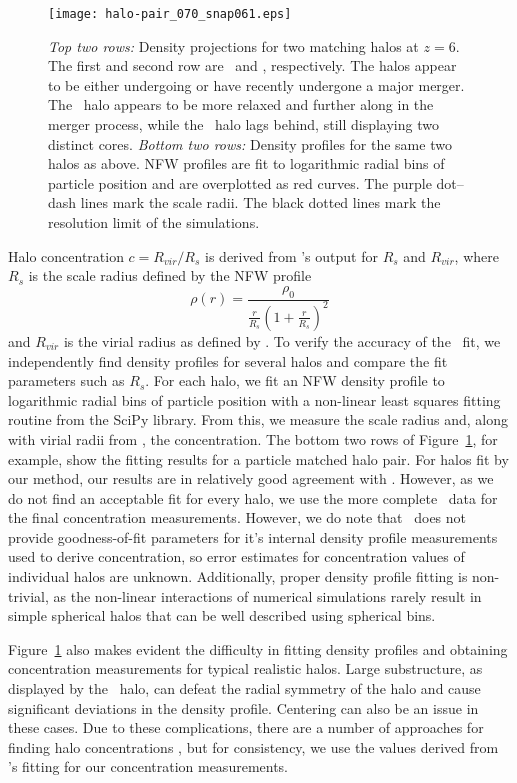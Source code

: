 \begin{figure}[t]
    \centering
    \texttt{[image: halo-pair\_070\_snap061.eps]}
    \caption[Comparison of matched \lpt\ and \za\ halos]{\footnotesize \textit{Top two rows:}  Density projections for two matching halos at $z = 6$.  The first and second row are \lpt\ and \za, respectively.  The halos appear to be either undergoing or have recently undergone a major merger.  The \lpt\ halo appears to be more relaxed and further along in the merger process, while the \za\ halo lags behind, still displaying two distinct cores.  \textit{Bottom two rows:}  Density profiles for the same two halos as above.  NFW profiles are fit to logarithmic radial bins of particle position and are overplotted as red curves.  The purple dot--dash lines mark the scale radii.  The black dotted lines mark the resolution limit of the simulations.}
    \label{fig:halo-pair}
\end{figure}

Halo concentration $c=R_{vir}/R_{s}$ is derived from \rockstar's output for $R_{s}$ and $R_{vir}$, where $R_{s}$ is the scale radius defined by the NFW \citep{1996ApJ...462..563N} profile
\begin{equation} \label{eq:nfw_profile}
	\rho(r) = \frac{ \rho_{0} }{ \frac{ r }{ R_{s}} \left( 1 + \frac{r}{R_{s}} \right)^{2} }
\end{equation}
and $R_{vir}$ is the virial radius as defined by \citet{1998ApJ...495...80B}.  To verify the accuracy of the \rockstar\ fit, we independently find density profiles for several halos and compare the fit parameters such as $R_{s}$.  For each halo, we fit an NFW density profile to logarithmic radial bins of particle position with a non-linear least squares fitting routine from the SciPy library.  From this, we measure the scale radius and, along with virial radii from \rockstar, the concentration.  The bottom two rows of Figure~\ref{fig:halo-pair}, for example, show the fitting results for a particle matched halo pair.  For halos fit by our method, our results are in relatively good agreement with \rockstar.  However, as we do not find an acceptable fit for every halo, we use the more complete \rockstar\ data for the final concentration measurements.  However, we do note that \rockstar\ does not provide goodness-of-fit parameters for it's internal density profile measurements used to derive concentration, so error estimates for concentration values of individual halos are unknown.  Additionally, proper density profile fitting is non-trivial, as the non-linear interactions of numerical simulations rarely result in simple spherical halos that can be well described using spherical bins.

Figure~\ref{fig:halo-pair} also makes evident the difficulty in fitting density profiles and obtaining concentration measurements for typical realistic halos.  Large substructure, as displayed by the \za\ halo, can defeat the radial symmetry of the halo and cause significant deviations in the density profile.  Centering can also be an issue in these cases.  Due to these complications, there are a number of approaches for finding halo concentrations \citep{2012MNRAS.423.3018P}, but for consistency, we use the values derived from \rockstar's fitting for our concentration measurements.
